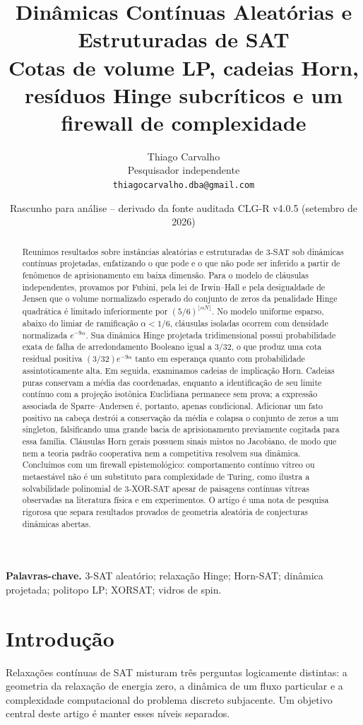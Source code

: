 \documentclass[11pt,a4paper]{article}
\title{\textbf{Dinâmicas Contínuas Aleatórias e Estruturadas de SAT}\\[0.3em]
\large Cotas de volume LP, cadeias Horn, resíduos Hinge subcríticos e um firewall de complexidade}
\author{Thiago Carvalho\\Pesquisador independente\\\texttt{thiagocarvalho.dba@gmail.com}}
\date{Rascunho para análise -- derivado da fonte auditada CLG-R v4.0.5 (setembro de 2026)}
\begin{document}
\maketitle

\begin{abstract}
Reunimos resultados sobre instâncias aleatórias e estruturadas de 3-SAT sob dinâmicas contínuas projetadas, enfatizando o que pode e o que não pode ser inferido a partir de fenômenos de aprisionamento em baixa dimensão. Para o modelo de cláusulas independentes, provamos por Fubini, pela lei de Irwin--Hall e pela desigualdade de Jensen que o volume normalizado esperado do conjunto de zeros da penalidade Hinge quadrática é limitado inferiormente por $(5/6)^{\lfloor\alpha N\rfloor}$. No modelo uniforme esparso, abaixo do limiar de ramificação $\alpha<1/6$, cláusulas isoladas ocorrem com densidade normalizada $e^{-9\alpha}$. Sua dinâmica Hinge projetada tridimensional possui probabilidade exata de falha de arredondamento Booleano igual a $3/32$, o que produz uma cota residual positiva $(3/32)e^{-9\alpha}$ tanto em esperança quanto com probabilidade assintoticamente alta. Em seguida, examinamos cadeias de implicação Horn. Cadeias puras conservam a média das coordenadas, enquanto a identificação de seu limite contínuo com a projeção isotônica Euclidiana permanece sem prova; a expressão associada de Sparre--Andersen é, portanto, apenas condicional. Adicionar um fato positivo na cabeça destrói a conservação da média e colapsa o conjunto de zeros a um singleton, falsificando uma grande bacia de aprisionamento previamente cogitada para essa família. Cláusulas Horn gerais possuem sinais mistos no Jacobiano, de modo que nem a teoria padrão cooperativa nem a competitiva resolvem sua dinâmica. Concluímos com um firewall epistemológico: comportamento contínuo vítreo ou metaestável não é um substituto para complexidade de Turing, como ilustra a solvabilidade polinomial de 3-XOR-SAT apesar de paisagens contínuas vítreas observadas na literatura física e em experimentos. O artigo é uma nota de pesquisa rigorosa que separa resultados provados de geometria aleatória de conjecturas dinâmicas abertas.
\end{abstract}

\noindent\textbf{Palavras-chave.} 3-SAT aleatório; relaxação Hinge; Horn-SAT; dinâmica projetada; politopo LP; XORSAT; vidros de spin.

\section{Introdução}
Relaxações contínuas de SAT misturam três perguntas logicamente distintas: a geometria da relaxação de energia zero, a dinâmica de um fluxo particular e a complexidade computacional do problema discreto subjacente. Um objetivo central deste artigo é manter esses níveis separados.
\end{document}
